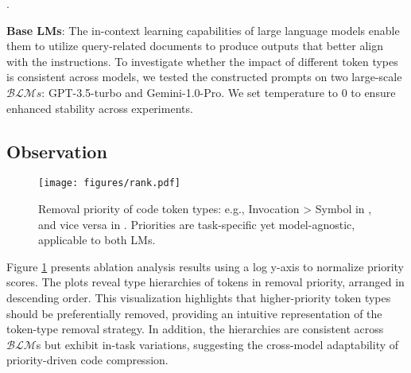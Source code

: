 .

\noindent\textbf{Base LMs}: The in-context learning capabilities of large language models enable them to utilize query-related documents to produce outputs that better align with the instructions. To investigate whether the impact of different token types is consistent across models, we tested the constructed prompts on two large-scale  $\mathcal{BLM}s$: GPT-3.5-turbo and Gemini-1.0-Pro. We set temperature to 0 to ensure enhanced stability across experiments.

\subsection{Observation}
\begin{figure}
    \centering
    \texttt{[image: figures/rank.pdf]}
    \vspace{-0.3in}
    \caption{Removal priority of code token types: e.g., Invocation \textgreater\xspace Symbol in \taskone, and vice versa in \taskthree. Priorities are task-specific yet model-agnostic, applicable to both LMs.}
    \label{fig:rank}
    \vspace{-0.5cm}
\end{figure}

Figure \ref{fig:rank} presents ablation analysis results using a log y-axis to normalize priority scores. The plots reveal type hierarchies of tokens in removal priority, arranged in descending order. This visualization highlights that higher-priority token types should be preferentially removed, providing an intuitive representation of the token-type removal strategy. In addition, the hierarchies are consistent across $\mathcal{BLM}$s but exhibit in-task variations, suggesting the cross-model adaptability of priority-driven code compression.









